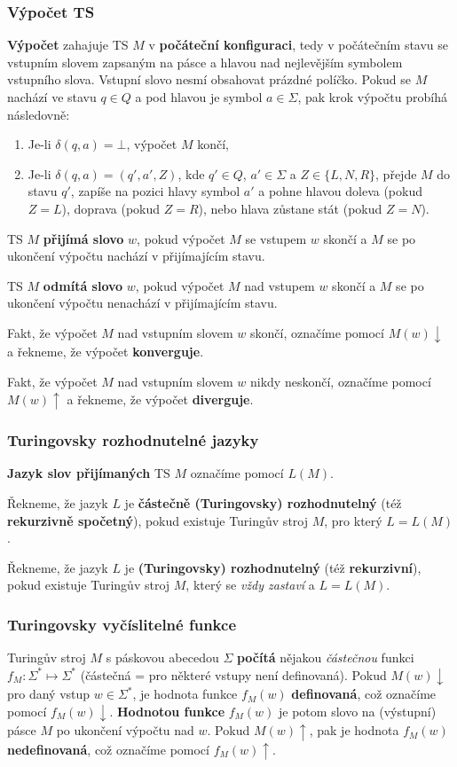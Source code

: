 \documentclass[11pt]{report} %
\numberwithin{equation}{section}
\begin{document}
\subsubsection{Výpočet TS}
\textbf{Výpočet} zahajuje TS $M$ v \textbf{počáteční konfiguraci}, tedy v počátečním stavu se vstupním slovem zapsaným na pásce a hlavou nad nejlevějším symbolem vstupního slova. Vstupní slovo nesmí obsahovat prázdné políčko. Pokud se $M$ nachází ve stavu $q \in Q$ a pod hlavou je symbol $a \in \Sigma$, pak krok výpočtu probíhá následovně:
\begin{enumerate}
	
	
	\item Je-li $\delta(q, a) = \bot$, výpočet $M$ končí,
	\item Je-li $\delta(q, a) = (q', a', Z)$, kde $q' \in Q$, $a' \in \Sigma$ a $Z \in \{L, N, R\}$, přejde $M$ do stavu $q'$, zapíše na pozici hlavy symbol $a'$ a pohne hlavou doleva (pokud $Z = L$), doprava (pokud $Z = R$), nebo hlava zůstane stát (pokud $Z = N$).	
\end{enumerate}

TS $M$ \textbf{přijímá slovo} $w$, pokud výpočet $M$ se vstupem $w$ skončí a $M$ se po ukončení výpočtu nachází v přijímajícím stavu. 

TS $M$ \textbf{odmítá slovo} $w$, pokud výpočet $M$ nad vstupem $w$ skončí a $M$ se po ukončení výpočtu nenachází v přijímajícím stavu. 

Fakt, že výpočet $M$ nad vstupním slovem $w$ skončí, označíme pomocí $M(w){\downarrow}$ a řekneme, že výpočet \textbf{konverguje}. 

Fakt, že výpočet $M$ nad vstupním slovem $w$ nikdy neskončí, označíme pomocí $M(w){\uparrow}$ a řekneme, že výpočet \textbf{diverguje}.

\subsubsection{Turingovsky rozhodnutelné jazyky}
\textbf{Jazyk slov přijímaných} TS $M$ označíme pomocí $L(M)$. 

Řekneme, že jazyk $L$ je \textbf{částečně (Turingovsky) rozhodnutelný} (též \textbf{rekurzivně spočetný}), pokud existuje
Turingův stroj $M$, pro který $L = L(M)$.

Řekneme, že jazyk $L$ je \textbf{(Turingovsky) rozhodnutelný} (též \textbf{rekurzivní}), pokud existuje Turingův stroj $M$, který se \textit{vždy zastaví} a $L = L(M)$.

\subsubsection{Turingovsky vyčíslitelné funkce}
Turingův stroj $M$ s páskovou abecedou $\Sigma$ \textbf{počítá} nějakou \textit{částečnou} funkci $f_M : \Sigma^* \mapsto \Sigma^*$ (částečná = pro některé vstupy není definovaná). Pokud $M(w){\downarrow}$ pro daný vstup $w \in \Sigma^*$, je hodnota funkce $f_M(w)$ \textbf{definovaná}, což označíme pomocí $f_M(w){\downarrow}$. \textbf{Hodnotou funkce} $f_M(w)$ je potom slovo na (výstupní) pásce $M$ po ukončení výpočtu nad $w$. Pokud $M(w){\uparrow}$, pak je hodnota $f_M(w)$ \textbf{nedefinovaná}, což označíme pomocí $f_M(w){\uparrow}$. 
\end{document}
